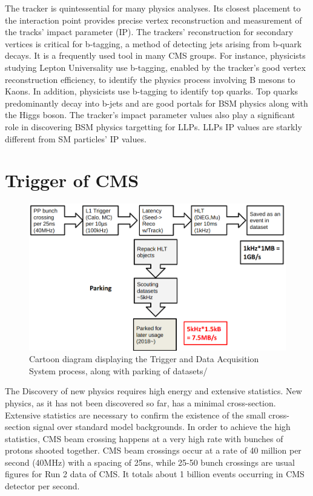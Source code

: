 The tracker is quintessential for many physics analyses.
Its closest placement to the interaction point provides precise vertex reconstruction and measurement of the tracks' impact parameter (IP).
The trackers' reconstruction for secondary vertices is critical for b-tagging, a method of detecting jets arising from b-quark decays.
It is a frequently used tool in many CMS groups.
For instance, physicists studying Lepton Universality use b-tagging, enabled by the tracker's good vertex reconstruction efficiency, to identify the physics process involving B mesons to Kaons.
In addition, physicists use b-tagging to identify top quarks.
Top quarks predominantly decay into b-jets and are good portals for BSM physics along with the Higgs boson.
The tracker's impact parameter values also play a significant role in discovering BSM physics targetting for LLPs.
LLPs IP values are starkly different from SM particles' IP values.


\section{Trigger of CMS}
\begin{figure}[h!]
	\caption{Cartoon diagram displaying the Trigger and Data Acquisition System process, along with parking of datasets/}
  \label{fig:trig}
  \centering
  \includegraphics[width=0.95\linewidth]{figs/Trig.png}
\end{figure}
The Discovery of new physics requires high energy and extensive statistics.
New physics, as it has not been discovered so far, has a minimal cross-section.
Extensive statistics are necessary to confirm the existence of the small cross-section signal over standard model backgrounds.
In order to achieve the high statistics, CMS beam crossing happens at a very high rate with bunches of protons shooted together.
CMS beam crossings occur at a rate of 40 million per second (40MHz) with a spacing of 25ns, while 25-50 bunch crossings are usual figures for Run 2 data of CMS.
It totals about 1 billion events occurring in CMS detector per second.

